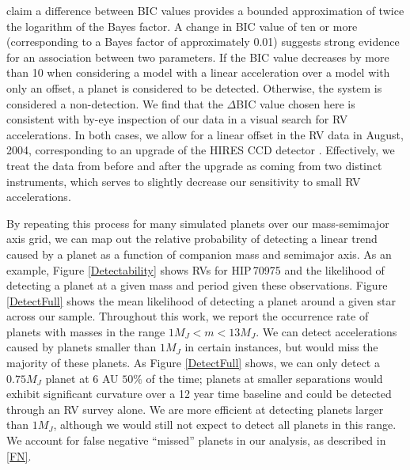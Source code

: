 \citet{Kass95} claim a difference between BIC values provides a bounded approximation of twice the logarithm of the Bayes factor. A change in BIC value of ten or more (corresponding to a Bayes factor of approximately 0.01) suggests strong evidence for an association between two parameters. If the BIC value decreases by more than 10 when considering a model with a linear acceleration over a model with only an offset, a planet is considered to be detected. Otherwise, the system is considered a non-detection. We find that the $\Delta$BIC value chosen here is consistent with by-eye inspection of our data in a visual search for RV accelerations. In both cases, we allow for a linear offset in the RV data in August, 2004, corresponding to an upgrade of the HIRES CCD detector \citep{Wright11}. Effectively, we treat the data from before and after the upgrade as coming from two distinct instruments, which serves to slightly decrease our sensitivity to small RV accelerations.

By repeating this process for many simulated planets over our mass-semimajor axis grid, we can map out the relative probability of detecting a linear trend caused by a planet as a function of companion mass and semimajor axis. As an example, Figure \ref{Detectability} shows RVs for HIP\,70975 and the likelihood of detecting a planet at a given mass and period given these observations. Figure \ref{DetectFull} shows the mean likelihood of detecting a planet around a given star across our sample. Throughout this work, we report the occurrence rate of planets with masses in the range $1 M_J < m < 13 M_J$. We can detect accelerations caused by planets smaller than $1 M_J$ in certain instances, but would miss the majority of these planets. As Figure \ref{DetectFull} shows, we can only detect a $0.75 M_J$ planet at 6 AU $50\%$ of the time; planets at smaller separations would exhibit significant curvature over a 12 year time baseline and could be detected through an RV survey alone. We are more efficient at detecting planets larger than $1 M_J$, although we would still not expect to detect all planets in this range. We account for false negative ``missed'' planets in our analysis, as described in \textsection\ref{FN}.




